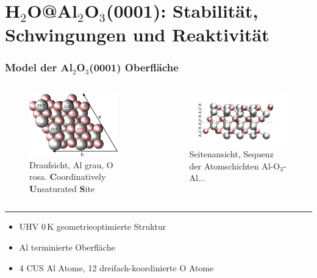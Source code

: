 \documentclass[hyperref={pdfpagelabels=false}]{beamer}
\begin{document}
\section{H$_2$O@Al$_2$O$_3$(0001): Stabilität, Schwingungen und Reaktivität}
\begin{frame}
 \frametitle{Model der Al$_2$O$_3$(0001) Oberfläche}
 \begin{columns}
   \begin{figure}
  \includegraphics[width=0.9\textwidth]{figures/surf_0K_axes.pdf}
  \caption{Draufsicht, Al grau, O rosa. \textbf{C}oordinatively \textbf{U}nsaturated \textbf{S}ite}
  \end{figure}
  \begin{figure}
  \includegraphics[width=1.\textwidth]{figures/surf_0K-side.pdf}
  \caption{Seitenansicht, Sequenz der Atomschichten Al-O$_3$-Al...}
  \end{figure}
  \end{columns}
 \hrule
 \begin{itemize}
  \item UHV $0\,$K geometrieoptimierte Struktur
  \item Al terminierte Oberfläche
  \item 4 CUS Al Atome, 12 dreifach-koordinierte O Atome
 \end{itemize}
\end{frame}
\end{document}
